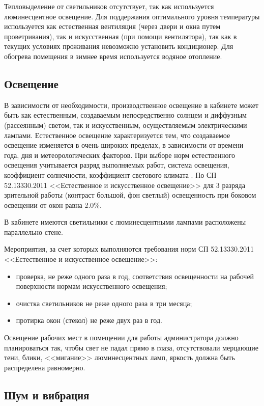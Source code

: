 Тепловыделение от светильников отсутствует, так как используется люминесцентное освещение.
Для поддержания оптимального уровня температуры используется как естественная вентиляция (через двери и окна путем проветривания), так и искусственная (при помощи вентилятора), так как в текущих условиях проживания невозможно установить кондиционер.
Для обогрева помещения в зимнее время используется водяное отопление.

\subsection{Освещение}

В зависимости от необходимости, производственное освещение в кабинете может быть как естественным, создаваемым непосредственно солнцем и диффузным (рассеянным) светом, так и искусственным, осуществляемым электрическими лампами.
Естественное освещение характеризуется тем, что создаваемое освещение изменяется в очень широких пределах, в зависимости от времени года, дня и метеорологических факторов.
При выборе норм естественного освещения учитывается разряд выполняемых работ, система освещения, коэффициент солнечности, коэффициент светового климата \cite{oot}.
По СП 52.13330.2011 <<Естественное и искусственное освещение>> для 3 разряда зрительной работы (контраст большой, фон светлый) освещенность при боковом освещении от окон равна 2.0\%.

В кабинете имеются светильники с люминесцентными лампами расположены параллельно стене.

Мероприятия, за счет которых выполняются требования норм СП 52.13330.2011 <<Естественное и искусственное освещение>>:
\begin{itemize}
  \item проверка, не реже одного раза в год, соответствия освещенности на рабочей поверхности нормам искусственного освещения;
  \item очистка светильников не реже одного раза в три месяца;
  \item протирка окон (стекол) не реже двух раз в год.
\end{itemize}

Освещение рабочих мест в помещении для работы администратора должно планироваться так, чтобы свет не падал прямо в глаза, отсутствовали мерцающие тени, блики, <<мигание>> люминесцентных ламп, яркость должна быть распределена равномерно.

\subsection{Шум и вибрация}


